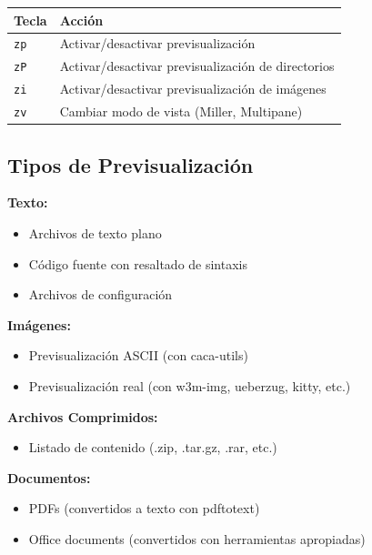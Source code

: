 \documentclass[
  doc,
  floatsintext,
  longtable,
  a4paper,
  nolmodern,
  notxfonts,
  notimes,
  12pt,
  colorlinks=true,linkcolor=blue,citecolor=blue,urlcolor=blue]{apa7}
\providecommand{\tightlist}{%
  \setlength{\itemsep}{0pt}\setlength{\parskip}{0pt}}
\newcounter{none} %
\begin{document}
{\def\LTcaptype{none} %
\begin{longtable}[]{@{}ll@{}}
\toprule\noalign{}
Tecla & Acción \\
\midrule\noalign{}
\endhead
\bottomrule\noalign{}
\endlastfoot
\texttt{zp} & Activar/desactivar previsualización \\
\texttt{zP} & Activar/desactivar previsualización de directorios \\
\texttt{zi} & Activar/desactivar previsualización de imágenes \\
\texttt{zv} & Cambiar modo de vista (Miller, Multipane) \\
\end{longtable}
}

\subsection{Tipos de
Previsualización}\label{tipos-de-previsualizaciuxf3n}

\textbf{Texto:}

\begin{itemize}
\tightlist
\item
  Archivos de texto plano
\item
  Código fuente con resaltado de sintaxis
\item
  Archivos de configuración
\end{itemize}

\textbf{Imágenes:}

\begin{itemize}
\tightlist
\item
  Previsualización ASCII (con caca-utils)
\item
  Previsualización real (con w3m-img, ueberzug, kitty, etc.)
\end{itemize}

\textbf{Archivos Comprimidos:}

\begin{itemize}
\tightlist
\item
  Listado de contenido (.zip, .tar.gz, .rar, etc.)
\end{itemize}

\textbf{Documentos:}

\begin{itemize}
\tightlist
\item
  PDFs (convertidos a texto con pdftotext)
\item
  Office documents (convertidos con herramientas apropiadas)
\end{itemize}
\end{document}
